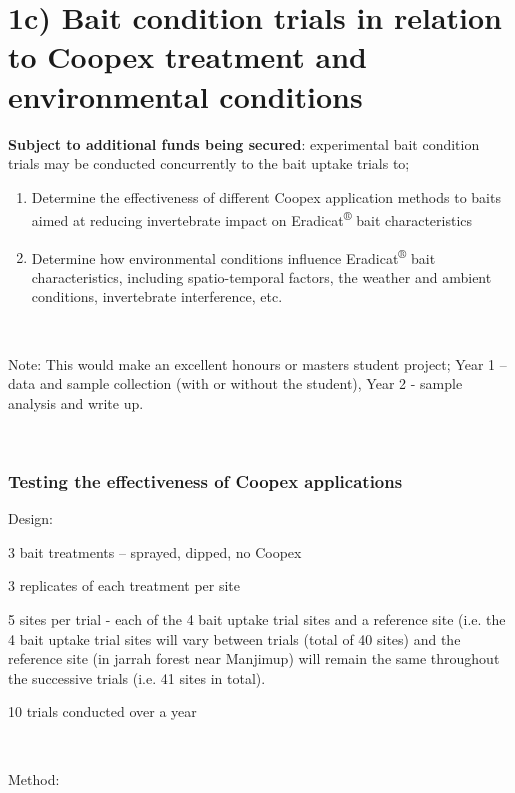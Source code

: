 \documentclass[version=last,
    paper=a4,                               %
    10pt,                                   %
    dvipsnames,
    oneside,                              %
    headings=openany,                       %
    open=any,
    BCOR=7mm,                               %
    DIV=15,     %
]{scrbook}
\begin{document}
\section{1c) Bait condition trials in relation to Coopex treatment and
environmental conditions}

\textbf{Subject to additional funds being secured}: experimental bait
condition trials may be conducted concurrently to the bait uptake trials
to;

\begin{enumerate}
\itemsep1pt\parskip0pt
\item
  Determine the effectiveness of different Coopex application methods to
  baits aimed at reducing invertebrate impact on
  Eradicat\textsuperscript{®} bait characteristics
\item
  Determine how environmental conditions influence
  Eradicat\textsuperscript{®} bait characteristics, including
  spatio-temporal factors, the weather and ambient conditions,
  invertebrate interference, etc.
\end{enumerate}

~

Note: This would make an excellent honours or masters student project;
Year 1 -- data and sample collection (with or without the student), Year
2 - sample analysis and write up.

~

\subsubsection{Testing the effectiveness of Coopex applications}

Design:

3 bait treatments -- sprayed, dipped, no Coopex

3 replicates of each treatment per site

5 sites per trial - each of the 4 bait uptake trial sites and a
reference site (i.e. the 4 bait uptake trial sites will vary between
trials (total of 40 sites) and the reference site (in jarrah forest near
Manjimup) will remain the same throughout the successive trials (i.e. 41
sites in total).

10 trials conducted over a year

~

Method:
\end{document}
